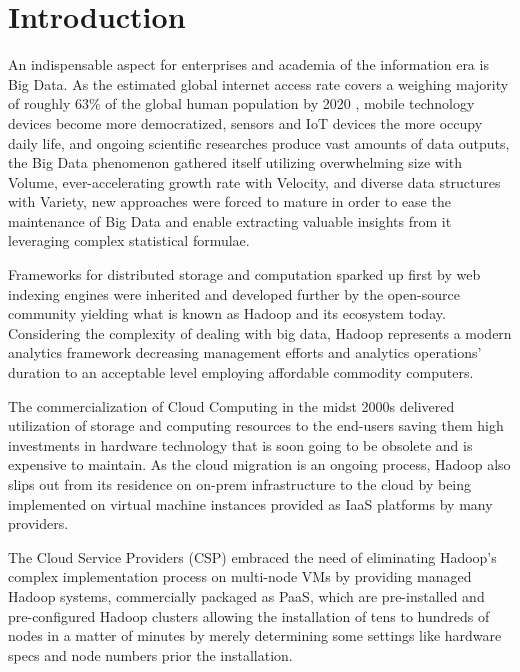 \documentclass[review]{elsarticle}
\begin{document}
\linenumbers

\section{Introduction}


An indispensable aspect for enterprises and academia of the information era is Big Data. As the estimated global internet access rate covers a weighing majority of roughly 63\% of the global human population by 2020 \cite{noauthor_world_nodate}, mobile technology devices become more democratized, sensors and IoT devices the more occupy daily life, and ongoing scientific researches produce vast amounts of data outputs, the Big Data phenomenon gathered itself utilizing overwhelming size with Volume, ever-accelerating growth rate with Velocity, and diverse data structures with Variety, new approaches were forced to mature in order to ease the maintenance of Big Data and enable extracting valuable insights from it leveraging complex statistical formulae.

Frameworks for distributed storage and computation sparked up first by web indexing engines were inherited and developed further by the open-source community yielding what is known as Hadoop \cite{noauthor_apache_nodate} and its ecosystem today. Considering the complexity of dealing with big data, Hadoop represents a modern analytics framework decreasing management efforts and analytics operations' duration to an acceptable level employing affordable commodity computers. 

The commercialization of Cloud Computing in the midst 2000s \cite{noauthor_announcing_nodate} delivered utilization of storage and computing resources to the end-users saving them high investments in hardware technology that is soon going to be obsolete and is expensive to maintain. As the cloud migration is an ongoing process, Hadoop also slips out from its residence on on-prem infrastructure to the cloud by being implemented on virtual machine instances provided as IaaS platforms by many providers. 

The Cloud Service Providers (CSP) embraced the need of eliminating Hadoop's complex implementation process on multi-node VMs by providing managed Hadoop systems, commercially packaged as PaaS, which are pre-installed and pre-configured Hadoop clusters allowing the installation of tens to hundreds of nodes in a matter of minutes by merely determining some settings like hardware specs and node numbers prior the installation. 
\end{document}

